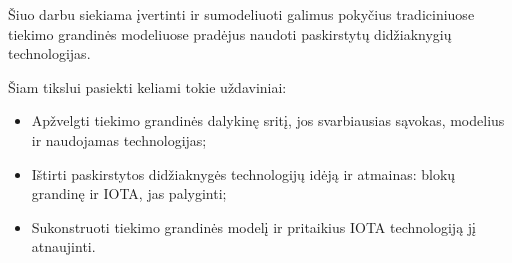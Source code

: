 Šiuo darbu siekiama įvertinti ir sumodeliuoti galimus pokyčius tradiciniuose tiekimo grandinės modeliuose pradėjus naudoti paskirstytų didžiaknygių technologijas.

Šiam tikslui pasiekti keliami tokie uždaviniai:
\begin{itemize}
    \item Apžvelgti tiekimo grandinės dalykinę sritį, jos svarbiausias sąvokas, modelius ir naudojamas technologijas;
    \item Ištirti paskirstytos didžiaknygės technologijų idėją ir atmainas: blokų grandinę ir IOTA, jas palyginti;
    \item Sukonstruoti tiekimo grandinės modelį ir pritaikius IOTA technologiją jį atnaujinti.
\end{itemize}

